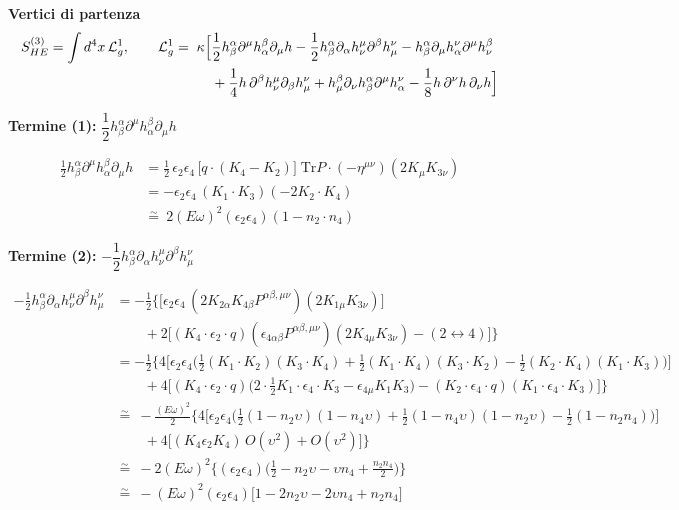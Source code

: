 \documentclass[11pt]{article}
\begin{document}
\noindent\textbf{Vertici di partenza}
\begin{align}
S^{(3)}_{HE} = \int d^4x\, \mathcal{L}_g^1, \qquad
\mathcal{L}_g^1 =\;\kappa  \Bigl[
&\frac{1}{2} h_\beta^\alpha \partial^\mu h_\alpha^\beta \partial_\mu h
- \frac{1}{2} h_\beta^\alpha \partial_\alpha h_\nu^\mu \partial^\beta h_\mu^\nu
- h_\beta^\alpha \partial_\mu h_\alpha^\nu \partial^\mu h_\nu^\beta \nonumber \\
&+ \frac{1}{4} h\, \partial^\beta h_\nu^\mu \partial_\beta h_\mu^\nu
+ h_\mu^\beta \partial_\nu h_\beta^\alpha \partial^\mu h_\alpha^\nu
- \frac{1}{8} h\, \partial^\nu h\, \partial_\nu h \Bigr]
\end{align}

\bigskip
\noindent\textbf{Termine (1):} $\dfrac{1}{2} h_\beta^\alpha \partial^\mu h_\alpha^\beta \partial_\mu h$

\begin{align*}
\frac12 h_\beta^\alpha \partial^\mu h_\alpha^\beta \partial_\mu h
&= \frac12\,\epsilon_2\epsilon_4\,\big[q\cdot(K_4-K_2)\big]\;\mathrm{Tr}P\cdot(-\eta^{\mu\nu})(2K_\mu K_{3\nu}) \\
&= -\epsilon_2\epsilon_4\,(K_1\cdot K_3)(-2K_2\cdot K_4) \\
&\overset{\sim}{=}\ 2(E\omega)^2(\epsilon_2\epsilon_4)(1-n_2\cdot n_4)
\end{align*}

\bigskip
\noindent\textbf{Termine (2):} $-\dfrac{1}{2} h_\beta^\alpha \partial_\alpha h_\nu^\mu \partial^\beta h_\mu^\nu$

\begin{align*}
-\frac12 h_\beta^\alpha \partial_\alpha h_\nu^\mu \partial^\beta h_\mu^\nu
&= -\frac12\Big\{\big[\epsilon_2\epsilon_4\,(2K_{2\alpha}K_{4\beta}P^{\alpha\beta,\mu\nu})(2K_{1\mu}K_{3\nu})\big] \\
&\qquad +2\big[(K_4\!\cdot\!\epsilon_2\!\cdot\! q)(\epsilon_{4\alpha\beta}P^{\alpha\beta,\mu\nu})(2K_{4\mu}K_{3\nu})-(2\leftrightarrow4)\big]\Big\} \\[4pt]
&= -\frac12\Big\{4\Big[\epsilon_2\epsilon_4\Big(\tfrac12(K_1\!\cdot\!K_2)(K_3\!\cdot\!K_4)+\tfrac12(K_1\!\cdot\!K_4)(K_3\!\cdot\!K_2)-\tfrac12(K_2\!\cdot\!K_4)(K_1\!\cdot\!K_3)\Big)\Big] \\
&\qquad +4\Big[(K_4\!\cdot\!\epsilon_2\!\cdot\! q)\Big(2\cdot\tfrac12 K_1\!\cdot\!\epsilon_4\!\cdot\! K_3-\epsilon_{4\mu}K_1K_3\Big)-(K_2\!\cdot\!\epsilon_4\!\cdot\! q)(K_1\!\cdot\!\epsilon_4\!\cdot\! K_3)\Big]\Big\} \\[4pt]
&\overset{\sim}{=}\ -\frac{(E\omega)^2}{2}\Big\{4\Big[\epsilon_2\epsilon_4\Big(\tfrac12(1-n_2\upsilon)(1-n_4\upsilon)+\tfrac12(1-n_4\upsilon)(1-n_2\upsilon)-\tfrac12(1-n_2n_4)\Big)\Big] \\
&\qquad +4\big[(K_4\epsilon_2K_4)\,O(\upsilon^2)+O(\upsilon^2)\big]\Big\} \\[4pt]
&\overset{\sim}{=}\ -2(E\omega)^2\Big\{(\epsilon_2\epsilon_4)\Big(\tfrac12-n_2\upsilon-\upsilon n_4+\tfrac{n_2n_4}{2}\Big)\Big\} \\[4pt]
&\overset{\sim}{=}\ -(E\omega)^2(\epsilon_2\epsilon_4)\big[1-2n_2\upsilon-2\upsilon n_4+n_2n_4\big]
\end{align*}
\end{document}

